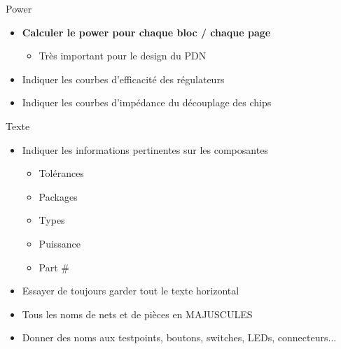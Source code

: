 \begin{frame}[plain]
\end{frame}

\begin{frame}{Power}
    \begin{twocolumns}[0.66]
        \leftcol
        \begin{itemize}
            \item \textbf{Calculer le power pour chaque bloc / chaque page}
            \begin{itemize}
                \item Très important pour le design du PDN
            \end{itemize}
            \item Indiquer les courbes d'efficacité des régulateurs
            \item Indiquer les courbes d'impédance du découplage des chips
        \end{itemize}
        \rightcol
    \end{twocolumns}
    \vfill
\end{frame}

\begin{frame}[plain]
\end{frame}

\begin{frame}{Texte}
    \begin{twocolumns}[0.8]
        \leftcol
        \begin{itemize}
            \item Indiquer les informations pertinentes sur les composantes
            \begin{itemize}
                \item Tolérances
                \item Packages
                \item Types
                \item Puissance
                \item Part \#
            \end{itemize}
            \item Essayer de toujours garder tout le texte horizontal
            \item Tous les noms de nets et de pièces en MAJUSCULES
            \item Donner des noms aux testpoints, boutons, switches, LEDs, connecteurs...
        \end{itemize}

        \rightcol
        \vspace{-24pt}
    \end{twocolumns}
\end{frame}



